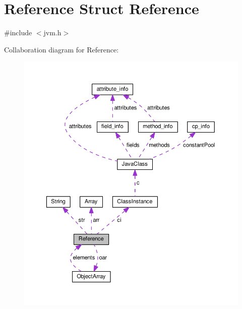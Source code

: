 \hypertarget{structReference}{}\section{Reference Struct Reference}
\label{structReference}


{\ttfamily \#include $<$jvm.\+h$>$}



Collaboration diagram for Reference\+:\nopagebreak
\begin{figure}[H]
\begin{center}
\leavevmode
\includegraphics[width=350pt]{structReference__coll__graph}
\end{center}
\end{figure}
